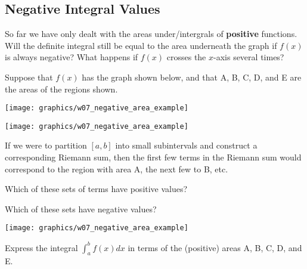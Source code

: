 




\subsection*{Negative Integral Values}

So far we have only dealt with the areas under/intergrals of {\bf
  positive} functions.  Will the definite integral still be equal to
the area underneath the graph if $f(x)$ is always negative?  What
happens if $f(x)$ crosses the $x$-axis several times?



\problem Suppose that $f(x)$ has the graph shown below, and that A, B,
  C, D, and E are the areas of the regions shown.

\begin{center}
\texttt{[image: graphics/w07\_negative\_area\_example]}
\end{center}

\newpage
\begin{center}
\texttt{[image: graphics/w07\_negative\_area\_example]}
\end{center}

If we were to partition $[a,b]$ into small subintervals and construct a corresponding Riemann sum, then the first few terms in the Riemann sum would correspond to the region with area A, the next few to B, etc. 

\problem 
Which of these sets of terms have positive values?

\vfill

Which of these sets have negative values?
\vfill

\newpage

\begin{center}
\texttt{[image: graphics/w07\_negative\_area\_example]}
\end{center}
\problem 
{Express the integral $\displaystyle \int_a^b f(x) dx$ in
  terms of the (positive) areas A, B, C, D, and E.  }

\vfill
\vfill

